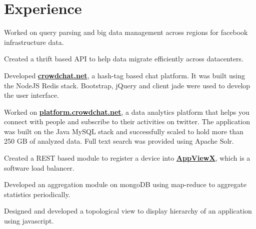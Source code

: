 \documentclass[]{bigfatnoob-resume}
\begin{document}
\hfill
\begin{minipage}[t]{0.66\textwidth} 


\section{Experience}

\vspace{\topsep} %
\begin{tightemize}
\item Worked on query parsing and big data management across regions for facebook infrastructure data.
\item Created a thrift based API to help data migrate efficiently across datacenters.
\end{tightemize}
\sectionsep

\begin{tightemize}
\item Developed \textbf{\href{https://www.crowdchat.net/}{crowdchat.net}}, a hash-tag based chat platform. It was built using the NodeJS Redis stack. Bootstrap, jQuery and client jade were used to develop the user interface.
\item Worked on \textbf{\href{https://platform.crowdchat.net}{platform.crowdchat.net}}, a data analytics platform that helps you connect with people and subscribe to their activities on twitter. The application was built on the Java MySQL stack and successfully scaled to hold more than 250 GB of analyzed data. Full text search was provided using Apache Solr.\end{tightemize}
\sectionsep

\begin{tightemize}
\item Created a REST based module to register a device into \textbf{\href{http://www.appviewx.com/}{AppViewX}}, which is a software load balancer.
\item Developed an aggregation module on mongoDB using map-reduce to aggregate statistics periodically.
\item Designed and developed a topological view to display hierarchy of an application using javascript.
\end{tightemize}
\sectionsep


\end{minipage}
\end{document}
